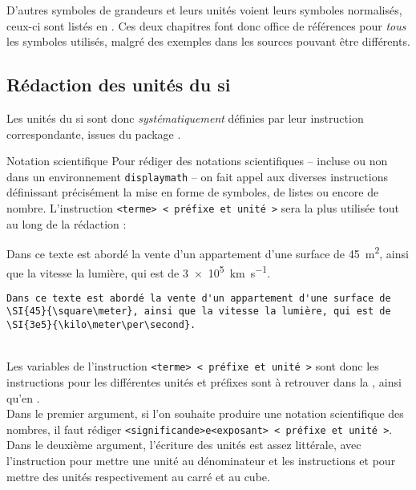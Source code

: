 \documentclass[a4paper, 11pt, twoside, fleqn]{memoir}
\begin{document}
D'autres symboles de grandeurs et leurs unités voient leurs symboles normalisés, ceux-ci sont listés en . Ces deux chapitres font donc office de références pour \emph{tous} les symboles utilisés, malgré des exemples dans les sources pouvant être différents. 

		\subsection{Rédaction des unités du \gls{si}}

Les unités du \gls{si} sont donc \emph{systématiquement} définies par leur instruction correspondante, issues du package . 

\begin{exemple}{Notation scientifique}{}
Pour rédiger des notations scientifiques -- incluse ou non dans un environnement \texttt{displaymath} -- on fait appel aux diverses instructions définissant précisément la mise en forme de symboles, de listes ou encore de nombre. L'instruction \texttt{\SI{<terme>}{<préfixe et unité>}} sera la plus utilisée tout au long de la rédaction :\\
  
\begin{minipage}[t]{0.49\linewidth}
Dans ce texte est abordé la vente d'un appartement d'une surface de \SI{45}{\square\meter}, ainsi que la vitesse la lumière, qui est de \SI{3e5}{\kilo\meter\per\second}.
\end{minipage}
\hfill
\begin{minipage}[t]{0.49\linewidth}
\begin{verbatim}
Dans ce texte est abordé la vente d'un appartement d'une surface de \SI{45}{\square\meter}, ainsi que la vitesse la lumière, qui est de \SI{3e5}{\kilo\meter\per\second}. 
\end{verbatim}
\end{minipage}\\

Les variables de l'instruction \texttt{\SI{<terme>}{<préfixe et unité>}} sont donc les instructions pour les différentes unités et préfixes sont à retrouver dans la , ainsi qu'en .\\
Dans le premier argument, si l'on souhaite produire une notation scientifique des nombres, il faut rédiger \texttt{\SI{<significande>e<exposant>}{<préfixe et unité>}}.\\
Dans le deuxième argument, l'écriture des unités est assez littérale, avec l'instruction \texttt{\per} pour mettre une unité au dénominateur et les instructions \texttt{\square} et \texttt{\cubic} pour mettre des unités respectivement au carré et au cube.\\


\end{exemple}
\end{document}
